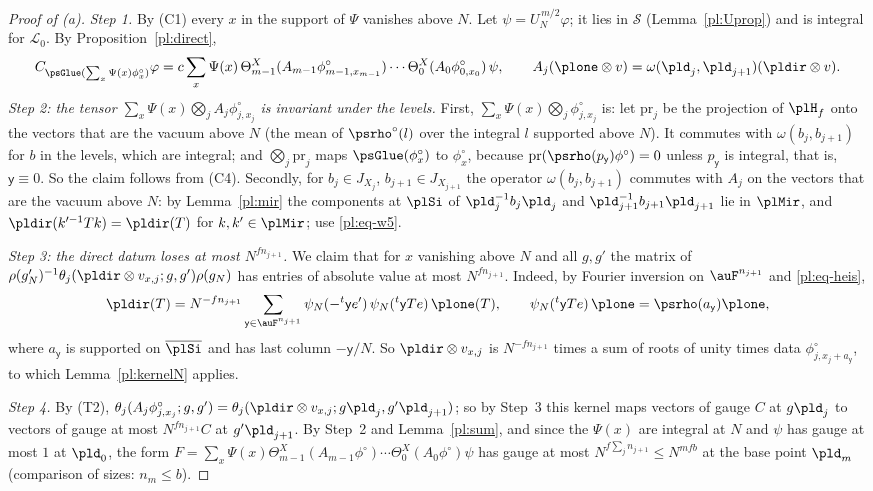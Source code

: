 \documentclass[10pt]{amsart}
\theoremstyle{definition}
\theoremstyle{remark}
\providecommand{\auS}{\mathcal S}
\providecommand{\aubar}[1]{\overline{#1}}
\begin{document}
\begin{proof}[Proof of {\rm(a)}]
\emph{Step 1.} By (C1) every $x$ in the support of $\Psi$ vanishes above $N$. Let $\psi=U_N^{\,
m/2}\varphi$; it lies in $\auS$ (Lemma~\ref{pl:Uprop}) and is integral for $\mathcal L_0$. By
Proposition~\ref{pl:direct},
\[
C_{\psGlue(\sum_x\Psi(x)\phi^\circ_x)}\varphi=c\sum_x\Psi(x)\,\Theta^X_{m-1}(A_{m-1}\phi^\circ_{m-1,
x_{m-1}})\cdots\Theta^X_0(A_0\phi^\circ_{0,x_0})\,\psi,\qquad A_j(\plone\otimes v)=\omega(\pld_j,
\pld_{j+1})(\pldir\otimes v).
\]
\emph{Step 2: the tensor $\sum_x\Psi(x)\bigotimes_jA_j\phi^\circ_{j,x_j}$ is invariant under the
levels.} First, $\sum_x\Psi(x)\bigotimes_j\phi^\circ_{j,x_j}$ is: let $\mathrm{pr}_j$ be the
projection of $\plH_f$ onto the vectors that are the vacuum above $N$ (the mean of $\psrho^\circ
(l)$ over the integral $l$ supported above $N$). It commutes with $\omega(b_j,b_{j+1})$ for $b$ in
the levels, which are integral; and $\bigotimes_j\mathrm{pr}_j$ maps $\psGlue(\phi^\circ_x)$ to
$\phi^\circ_x$, because $\mathrm{pr}(\psrho(p_{\mathsf y})\phi^\circ)=0$ unless $p_{\mathsf y}$ is
integral, that is, $\mathsf y\equiv0$. So the claim follows from (C4). Secondly, for $b_j\in
J_{X_j}$, $b_{j+1}\in J_{X_{j+1}}$ the operator $\omega(b_j,b_{j+1})$ commutes with $A_j$ on the
vectors that are the vacuum above $N$: by Lemma~\ref{pl:mir} the components at $\plSi$ of $\pld_j^{
-1}b_j\pld_j$ and $\pld_{j+1}^{-1}b_{j+1}\pld_{j+1}$ lie in $\plMir$, and $\pldir(k'^{-1}Tk)=
\pldir(T)$ for $k,k'\in\plMir$; use \eqref{pl:eq-w5}.

\emph{Step 3: the direct datum loses at most $N^{fn_{j+1}}$.} We claim that for $x$ vanishing
above $N$ and all $g,g'$ the matrix of $\rho(g'_N)^{-1}\theta_j(\pldir\otimes v_{x,j};g,g')\rho
(g_N)$ has entries of absolute value at most $N^{fn_{j+1}}$. Indeed, by Fourier inversion on
$\auF^{n_{j+1}}$ and \eqref{pl:eq-heis},
\[
\pldir(T)=N^{-fn_{j+1}}\sum_{\mathsf y\in\auF^{n_{j+1}}}\psi_N(-{}^t\mathsf ye')\,\psi_N({}^t\mathsf
yTe)\,\plone(T),\qquad\psi_N({}^t\mathsf yTe)\,\plone=\psrho(a_{\mathsf y})\plone,
\]
where $a_{\mathsf y}$ is supported on $\aubar{\plSi}$ and has last column $-\mathsf y/N$. So
$\pldir\otimes v_{x,j}$ is $N^{-fn_{j+1}}$ times a sum of roots of unity times data $\phi^\circ_{j,
x_j+a_{\mathsf y}}$, to which Lemma~\ref{pl:kernelN} applies.

\emph{Step 4.} By (T2), $\theta_j(A_j\phi^\circ_{j,x_j};g,g')=\theta_j(\pldir\otimes v_{x,j};g
\pld_j,g'\pld_{j+1})$; so by Step~3 this kernel maps vectors of gauge $C$ at $g\pld_j$ to vectors
of gauge at most $N^{fn_{j+1}}C$ at $g'\pld_{j+1}$. By Step~2 and Lemma~\ref{pl:sum}, and since the
$\Psi(x)$ are integral at $N$ and $\psi$ has gauge at most $1$ at $\pld_0$, the form
$F=\sum_x\Psi(x)\Theta^X_{m-1}(A_{m-1}\phi^\circ)\cdots\Theta^X_0(A_0\phi^\circ)\psi$ has gauge at
most $N^{f\sum_jn_{j+1}}\le N^{mfb}$ at the base point $\pld_m$ (comparison of sizes: $n_m\le b$).


\end{proof}
\end{document}

